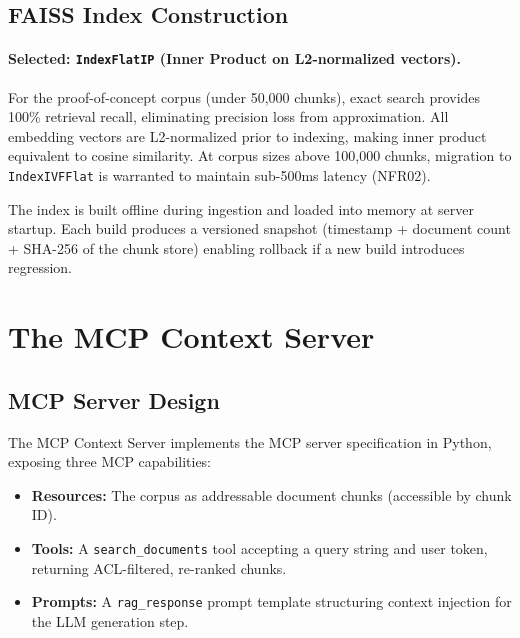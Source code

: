 \subsection{FAISS Index Construction}

\paragraph{Selected: \texttt{IndexFlatIP} (Inner Product on L2-normalized vectors).} For the proof-of-concept corpus (under 50,000 chunks), exact search provides 100\% retrieval recall, eliminating precision loss from approximation. All embedding vectors are L2-normalized prior to indexing, making inner product equivalent to cosine similarity. At corpus sizes above 100,000 chunks, migration to \texttt{IndexIVFFlat} is warranted to maintain sub-500ms latency (NFR02).

The index is built offline during ingestion and loaded into memory at server startup. Each build produces a versioned snapshot (timestamp + document count + SHA-256 of the chunk store) enabling rollback if a new build introduces regression.

\section{The MCP Context Server}
\label{sec:arch-mcp-server}

\subsection{MCP Server Design}

The MCP Context Server implements the MCP server specification \citep{Anthropic2024MCP, MCPSpec2025} in Python, exposing three MCP capabilities:

\begin{itemize}
  \item \textbf{Resources:} The corpus as addressable document chunks (accessible by chunk ID).
  \item \textbf{Tools:} A \texttt{search\_documents} tool accepting a query string and user token, returning ACL-filtered, re-ranked chunks.
  \item \textbf{Prompts:} A \texttt{rag\_response} prompt template structuring context injection for the LLM generation step.
\end{itemize}

